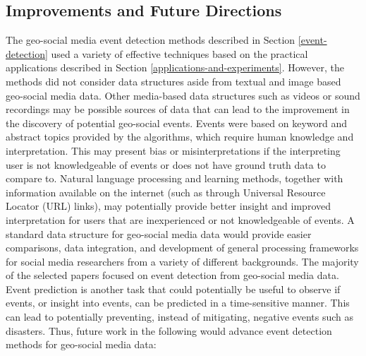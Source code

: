 \subsection{Improvements and Future Directions} \label{improvements-and-future-directions}

The geo-social media event detection methods described in Section \ref{event-detection} used a variety of effective techniques based on the practical applications described in Section \ref{applications-and-experiments}. However, the methods did not consider data structures aside from textual and image based geo-social media data. Other media-based data structures such as videos or sound recordings may be possible sources of data that can lead to the improvement in the discovery of potential geo-social events. Events were based on keyword and abstract topics provided by the algorithms, which require human knowledge and interpretation. This may present bias or misinterpretations if the interpreting user is not knowledgeable of events or does not have ground truth data to compare to. Natural language processing and learning methods, together with information available on the internet (such as through Universal Resource Locator (URL) links), may potentially provide better insight and improved interpretation for users that are inexperienced or not knowledgeable of events. A standard data structure for geo-social media data would provide easier comparisons, data integration, and development of general processing frameworks for social media researchers from a variety of different backgrounds. The majority of the selected papers focused on event detection from geo-social media data. Event prediction is another task that could potentially be useful to observe if events, or insight into events, can be predicted in a time-sensitive manner. This can lead to potentially preventing, instead of mitigating, negative events such as disasters. Thus, future work in the following would advance event detection methods for geo-social media data:

